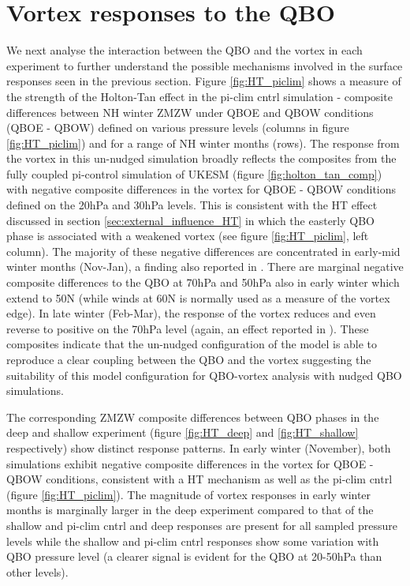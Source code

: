 \section{Vortex responses to the QBO}
\label{sec:vortex_responses_QBO}
We next analyse the interaction between the QBO and the vortex in each experiment to further understand the possible mechanisms involved in the surface responses seen in the previous section. Figure \ref{fig:HT_piclim} shows a measure of the strength of the Holton-Tan effect in the pi-clim cntrl simulation -  composite differences between NH winter ZMZW under QBOE and QBOW conditions (QBOE - QBOW) defined on various pressure levels (columns in figure \ref{fig:HT_piclim}) and for a range of NH winter months (rows). The response from the vortex in this un-nudged simulation broadly reflects the composites from the fully coupled pi-control simulation of UKESM (figure \ref{fig:holton_tan_comp}) with negative composite differences in the vortex for QBOE - QBOW conditions defined on the 20hPa and 30hPa levels. This is consistent with the HT effect discussed in section \ref{sec:external_influence_HT} in which the easterly QBO phase is associated with a weakened vortex (see figure \ref{fig:HT_piclim}, left column). The majority of these negative differences are concentrated in early-mid winter months (Nov-Jan), a finding also reported in \cite{graySurface2018b}. There are marginal negative composite differences to the QBO at 70hPa and 50hPa also in early winter which extend to 50N (while winds at 60N is normally used as a measure of the vortex edge). In late winter (Feb-Mar), the response of the vortex reduces and even reverse to positive on the 70hPa level (again, an effect reported in \cite{graySurface2018b}). These composites indicate that the un-nudged configuration of the model is able to reproduce a clear coupling between the QBO and the vortex suggesting the suitability of this model configuration for QBO-vortex analysis with nudged QBO simulations.

The corresponding ZMZW composite differences between QBO phases in the deep and shallow experiment (figure \ref{fig:HT_deep} and \ref{fig:HT_shallow} respectively) show distinct response patterns. In early winter (November), both simulations exhibit negative composite differences in the vortex for QBOE - QBOW conditions, consistent with a HT mechanism \citep{HoltonJamesRTan1980} as well as the pi-clim cntrl (figure \ref{fig:HT_piclim}). The magnitude of vortex responses in early winter months is marginally larger in the deep experiment compared to that of the shallow and pi-clim cntrl and deep responses are present for all sampled pressure levels while the shallow and pi-clim cntrl responses show some variation with QBO pressure level (a clearer signal is evident for the QBO at 20-50hPa than other levels). 

